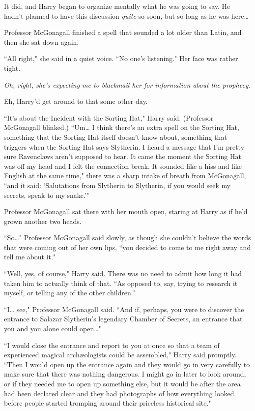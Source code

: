 It did, and Harry began to organize mentally what he was going to say. He hadn't planned to have this discussion \emph{quite} so soon, but so long as he was here{\ldots}

Professor McGonagall finished a spell that sounded a lot older than Latin, and then she sat down again.

``All right," she said in a quiet voice. ``No one's listening." Her face was rather tight.

\emph{Oh, right, she's expecting me to blackmail her for information about the prophecy.}

Eh, Harry'd get around to that some other day.

``It's about the Incident with the Sorting Hat," Harry said. (Professor McGonagall blinked.) ``Um{\ldots} I think there's an extra spell on the Sorting Hat, something that the Sorting Hat itself doesn't know about, something that triggers when the Sorting Hat says Slytherin. I heard a message that I'm pretty sure Ravenclaws aren't supposed to hear. It came the moment the Sorting Hat was off my head and I felt the connection break. It sounded like a hiss and like English at the same time," there was a sharp intake of breath from McGonagall, ``and it said: `Salutations from Slytherin to Slytherin, if you would seek my secrets, speak to my snake.'{}"

Professor McGonagall sat there with her mouth open, staring at Harry as if he'd grown another two heads.

``So{\ldots}" Professor McGonagall said slowly, as though she couldn't believe the words that were coming out of her own lips, ``you decided to come to me right away and tell me about it."

``Well, yes, of course," Harry said. There was no need to admit how long it had taken him to actually think of that. ``As opposed to, say, trying to research it myself, or telling any of the other children."

``I{\ldots} see," Professor McGonagall said. ``And if, perhaps, you were to discover the entrance to Salazar Slytherin's legendary Chamber of Secrets, an entrance that you and you alone could open{\ldots}"

``I would close the entrance and report to you at once so that a team of experienced magical archæologists could be assembled," Harry said promptly. ``Then I would open up the entrance again and they would go in very carefully to make sure that there was nothing dangerous. I might go in later to look around, or if they needed me to open up something else, but it would be after the area had been declared clear and they had photographs of how everything looked before people started tromping around their priceless historical site."

